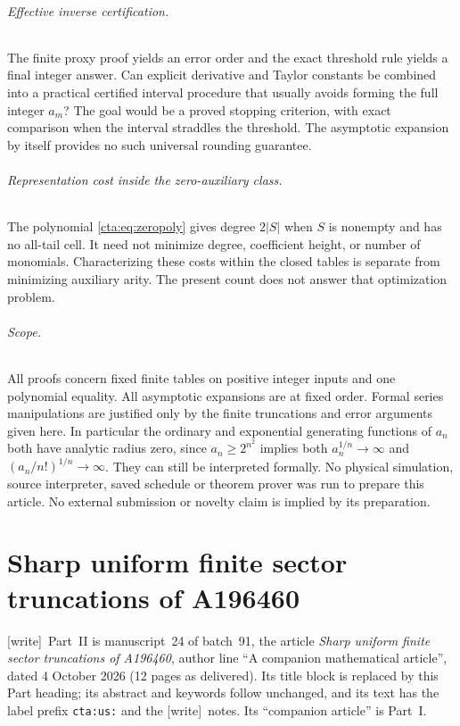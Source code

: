 \documentclass[11pt]{article}
\theoremstyle{definition}
\theoremstyle{remark}
\newcommand{\wtag}{\textup{[write]}}
\begin{document}
\paragraph{Effective inverse certification.}
The finite proxy proof yields an error order and the exact threshold
rule yields a final integer answer. Can explicit derivative and Taylor
constants be combined into a practical certified interval procedure that
usually avoids forming the full integer $a_m$? The goal would be a
proved stopping criterion, with exact comparison when the interval
straddles the threshold. The asymptotic expansion by itself provides no
such universal rounding guarantee.

\paragraph{Representation cost inside the zero-auxiliary class.}
The polynomial \eqref{cta:eq:zeropoly} gives degree $2|S|$ when $S$ is nonempty
and has no all-tail cell. It need not minimize degree, coefficient height,
or number of monomials. Characterizing these costs within the closed tables
is separate from minimizing auxiliary arity. The present count does not
answer that optimization problem.

\paragraph{Scope.}
All proofs concern fixed finite tables on positive integer inputs and one
polynomial equality. All asymptotic expansions are at fixed order. Formal
series manipulations are justified only by the finite truncations and
error arguments given here. In particular the ordinary and exponential
generating functions of $a_n$ both have analytic radius zero, since
$a_n\geq2^{n^2}$ implies both $a_n^{1/n}\to\infty$ and
$(a_n/n!)^{1/n}\to\infty$. They can still be interpreted formally.
No physical simulation, source interpreter, saved schedule or theorem
prover was run to prepare this article. No external submission or novelty
claim is implied by its preparation.

\part{Sharp uniform finite sector truncations of A196460}\label{cta:us:part}

\wtag\ Part~II is manuscript~24 of batch~91, the article \emph{Sharp
uniform finite sector truncations of A196460}, author line ``A companion
mathematical article'', dated 4 October 2026 (12 pages as delivered). Its
title block is replaced by this Part heading; its abstract and keywords
follow unchanged, and its text has the label prefix \texttt{cta:us:} and
the \wtag\ notes. Its ``companion article'' \cite{fixed} is Part~I.
\end{document}
